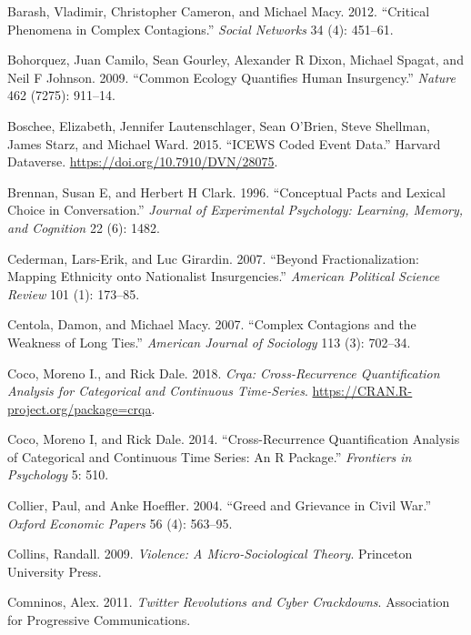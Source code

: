 \documentclass[
  english,
  man]{apa6}
\begin{document}
\leavevmode\hypertarget{ref-barash2012critical}{}%
Barash, Vladimir, Christopher Cameron, and Michael Macy. 2012. ``Critical Phenomena in Complex Contagions.'' \emph{Social Networks} 34 (4): 451--61.

\leavevmode\hypertarget{ref-bohorquez2009common}{}%
Bohorquez, Juan Camilo, Sean Gourley, Alexander R Dixon, Michael Spagat, and Neil F Johnson. 2009. ``Common Ecology Quantifies Human Insurgency.'' \emph{Nature} 462 (7275): 911--14.

\leavevmode\hypertarget{ref-DVNux2f28075_2015}{}%
Boschee, Elizabeth, Jennifer Lautenschlager, Sean O'Brien, Steve Shellman, James Starz, and Michael Ward. 2015. ``ICEWS Coded Event Data.'' Harvard Dataverse. \url{https://doi.org/10.7910/DVN/28075}.

\leavevmode\hypertarget{ref-brennan1996conceptual}{}%
Brennan, Susan E, and Herbert H Clark. 1996. ``Conceptual Pacts and Lexical Choice in Conversation.'' \emph{Journal of Experimental Psychology: Learning, Memory, and Cognition} 22 (6): 1482.

\leavevmode\hypertarget{ref-cederman2007beyond}{}%
Cederman, Lars-Erik, and Luc Girardin. 2007. ``Beyond Fractionalization: Mapping Ethnicity onto Nationalist Insurgencies.'' \emph{American Political Science Review} 101 (1): 173--85.

\leavevmode\hypertarget{ref-centola2007complex}{}%
Centola, Damon, and Michael Macy. 2007. ``Complex Contagions and the Weakness of Long Ties.'' \emph{American Journal of Sociology} 113 (3): 702--34.

\leavevmode\hypertarget{ref-R-crqa}{}%
Coco, Moreno I., and Rick Dale. 2018. \emph{Crqa: Cross-Recurrence Quantification Analysis for Categorical and Continuous Time-Series}. \url{https://CRAN.R-project.org/package=crqa}.

\leavevmode\hypertarget{ref-coco2014cross}{}%
Coco, Moreno I, and Rick Dale. 2014. ``Cross-Recurrence Quantification Analysis of Categorical and Continuous Time Series: An R Package.'' \emph{Frontiers in Psychology} 5: 510.

\leavevmode\hypertarget{ref-collier2004greed}{}%
Collier, Paul, and Anke Hoeffler. 2004. ``Greed and Grievance in Civil War.'' \emph{Oxford Economic Papers} 56 (4): 563--95.

\leavevmode\hypertarget{ref-collins2009violence}{}%
Collins, Randall. 2009. \emph{Violence: A Micro-Sociological Theory}. Princeton University Press.

\leavevmode\hypertarget{ref-comninos2011twitter}{}%
Comninos, Alex. 2011. \emph{Twitter Revolutions and Cyber Crackdowns}. Association for Progressive Communications.
\end{document}
